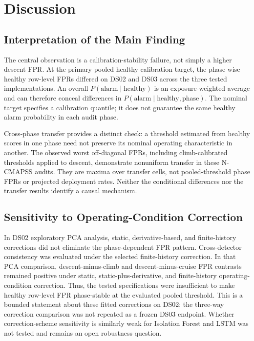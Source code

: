 \documentclass[preprint,12pt]{elsarticle}
\begin{document}
\section{Discussion}\label{discussion}

\subsection{Interpretation of the Main Finding}\label{interpretation-of-the-main-finding}

The central observation is a calibration-stability failure, not simply a higher descent FPR. At the primary pooled healthy calibration target, the phase-wise healthy row-level FPRs differed on DS02 and DS03 across the three tested implementations. An overall \(P(\mathrm{alarm}\mid\mathrm{healthy})\) is an exposure-weighted average and can therefore conceal differences in \(P(\mathrm{alarm}\mid\mathrm{healthy},\mathrm{phase})\). The nominal target specifies a calibration quantile; it does not guarantee the same healthy alarm probability in each audit phase.

Cross-phase transfer provides a distinct check: a threshold estimated from healthy scores in one phase need not preserve its nominal operating characteristic in another. The observed worst off-diagonal FPRs, including climb-calibrated thresholds applied to descent, demonstrate nonuniform transfer in these N-CMAPSS audits. They are maxima over transfer cells, not pooled-threshold phase FPRs or projected deployment rates. Neither the conditional differences nor the transfer results identify a causal mechanism.

\subsection{Sensitivity to Operating-Condition Correction}\label{sensitivity-to-operating-condition-correction-1}

In DS02 exploratory PCA analysis, static, derivative-based, and finite-history corrections did not eliminate the phase-dependent FPR pattern. Cross-detector consistency was evaluated under the selected finite-history correction. In that PCA comparison, descent-minus-climb and descent-minus-cruise FPR contrasts remained positive under static, static-plus-derivative, and finite-history operating-condition correction. Thus, the tested specifications were insufficient to make healthy row-level FPR phase-stable at the evaluated pooled threshold. This is a bounded statement about these fitted corrections on DS02; the three-way correction comparison was not repeated as a frozen DS03 endpoint. Whether correction-scheme sensitivity is similarly weak for Isolation Forest and LSTM was not tested and remains an open robustness question.
\end{document}
